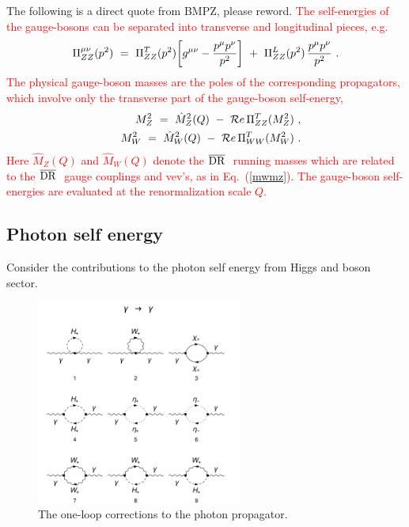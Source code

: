 \documentclass[11pt]{article}
\begin{document}
The following is a direct quote from BMPZ, please reword.
 \textcolor{red}{
The self-energies of the gauge-bosons can be separated into transverse
and longitudinal pieces, e.g.
%
\begin{equation}
\Pi^{\mu\nu}_{ZZ}(p^2) \ =\ \Pi_{ZZ}^T(p^2)\biggl[g^{\mu\nu}
-{p^{\mu}p^{\nu}\over p^2}\biggr] \ +\ \Pi_{ZZ}^L(p^2)\,
{p^{\mu}p^{\nu}\over p^2}\ .
\end{equation}
%
The physical gauge-boson masses are the poles of the corresponding
propagators, which involve only the transverse part of the gauge-boson
self-energy,
%
\begin{eqnarray}
&& M_Z^2 \ =\ \hat M_Z^2(Q) \ -\ {\cal
R}e\,\Pi^T_{ZZ}(M_Z^2)~,\label{mz}\\ && M_W^2 \ =\ \hat M_W^2(Q) \ -
\ {\cal R}e\,\Pi^T_{WW}(M_W^2)~.
\end{eqnarray}
%
Here $\hat M_Z(Q)$ and $\hat M_W(Q)$ denote the
\mbox{\footnotesize$\overline{\rm DR}~$} running masses which are
related to the \mbox{\footnotesize$\overline{\rm DR}~$} gauge
couplings and vev's, as in Eq.~(\ref{mwmz}). The gauge-boson
self-energies are evaluated at the renormalization scale $Q$.
}

\subsection{Photon self energy}

Consider the contributions to the photon self energy from Higgs and boson sector. 

\begin{figure}[h!]
\center
\includegraphics[width=0.6\textwidth]{diagrams_V[1]_1.pdf}
\caption{The one-loop corrections to the photon propagator.}\label{fig:gammagamma}
\end{figure}
\end{document}

